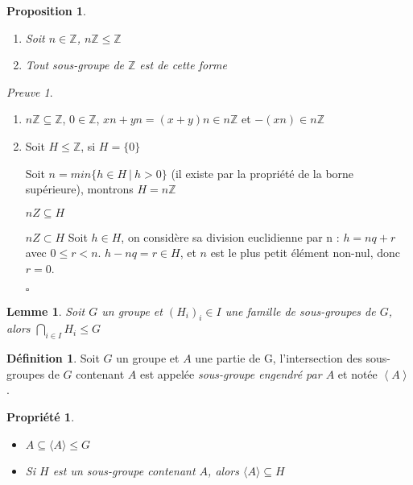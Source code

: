 \documentclass[]{article}
\newtheorem{myproposition}{Proposition}
\newtheorem{myproperty}{Propriété}
\newtheorem{mylemma}{Lemme}
\theoremstyle{remark}
\newtheorem{myproof}{Preuve}
\theoremstyle{definition}
\newtheorem{mydef}{Définition}
\newcommand{\cqfd}{
	\hfill$\square$
}
\newenvironment{proofpart}{
	
}{
}
\begin{document}
\begin{myproposition}
	\leavevmode
	\begin{enumerate}
		\item Soit $n \in \mathbb{Z}$, $n\mathbb{Z} \leqslant \mathbb{Z}$
		\item Tout sous-groupe de $\mathbb{Z}$ est de cette forme
	\end{enumerate}
\end{myproposition}

\begin{myproof}
	\leavevmode
	\begin{enumerate}
		\item $n\mathbb{Z} \subseteq \mathbb{Z}$, $0 \in \mathbb{Z}$, $xn + yn = (x+y)n \in n\mathbb{Z}$ et $-(xn) \in n\mathbb{Z}$
		\item Soit $H \leqslant \mathbb{Z}$, si $H = \{0\}$ \checkmark
		
		Soit $n = min\{h \in H ~|~ h > 0\}$ (il existe par la propriété de la borne supérieure), montrons $H = n\mathbb{Z}$

		{\boldmath $nZ \subseteq H$} \checkmark

		\begin{proofpart}{$nZ \subset H$}
			Soit $h \in H$, on considère sa division euclidienne par n : $h = nq + r$ avec $0 \leqslant r < n$.
			$h - nq = r\in H$, et $n$ est le plus petit élément non-nul, donc $r = 0$.
		\end{proofpart}
		
		\cqfd
	\end{enumerate}
\end{myproof}

\begin{mylemma}
	Soit $G$ un groupe et $\left(H_i\right)_i \in I$ une famille de sous-groupes de $G$, alors $\displaystyle \bigcap_{i \in I}H_i \leqslant G$
\end{mylemma}

\begin{mydef}
	Soit $G$ un groupe et $A$ une partie de G, l'intersection des sous-groupes de $G$ contenant $A$ est appelée \textit{sous-groupe engendré par $A$} et notée $\left\langle A \right\rangle$.
\end{mydef}

\begin{myproperty}
	\leavevmode
	\begin{itemize}
		\item $A \subseteq \langle A \rangle \leqslant G$
		\item Si $H$ est un sous-groupe contenant $A$, alors $\langle A \rangle \subseteq H$
	\end{itemize}
\end{myproperty}
\end{document}

